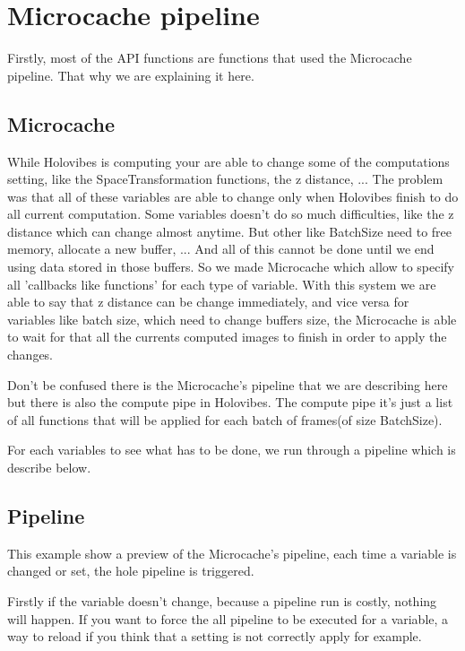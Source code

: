 \section{Microcache pipeline}



Firstly, most of the API functions are functions that used the Microcache pipeline. That why we are explaining it here.

\subsection{Microcache}
While Holovibes is computing your are able to change some of the computations setting, like the SpaceTransformation functions, the z distance, ...
The problem was that all of these variables are able to change only when Holovibes finish to do all current computation. Some variables doesn't do so much difficulties, like the z distance which can change almost anytime. But other like BatchSize need to free memory, allocate a new buffer, ...
And all of this cannot be done until we end using data stored in those buffers.
So we made Microcache which allow to specify all 'callbacks like functions' for each type of variable. With this system we are able to say that z distance can be change immediately, and vice versa for variables like batch size, which need to change buffers size, the Microcache is able to wait for that all the currents computed images to finish in order to apply the changes.

Don't be confused there is the Microcache's pipeline that we are describing here but there is also the compute pipe in Holovibes. The compute pipe it's just a list of all functions that will be applied for each batch of frames(of size BatchSize).

For each variables to see what has to be done, we run through a pipeline which is describe below.

\subsection{Pipeline}


This example show a preview of the Microcache's pipeline, each time a variable is changed or set, the hole pipeline is triggered.

Firstly if the variable doesn't change, because a pipeline run is costly, nothing will happen. If you want to force the all pipeline to be executed for a variable, a way to reload if you think that a setting is not correctly apply for example.

